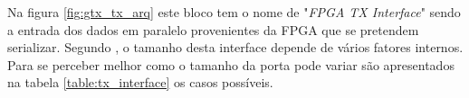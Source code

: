 Na figura \ref{fig:gtx_tx_arq} este bloco tem o nome de "\textit{FPGA TX Interface}" sendo a entrada dos dados em paralelo provenientes da FPGA que se pretendem serializar. Segundo \cite{R011}, o tamanho desta interface depende de vários fatores internos. Para se perceber melhor como o tamanho da porta pode variar são apresentados na tabela \ref{table:tx_interface} os casos possíveis.


\begin{table}[h!]
	\centering
		\caption[Tamanhos da interface da FPGA com o GTX transmissor]{Tamanhos da interface da FPGA com o GTX transmissor (adaptada de \cite{R011})}
	\label{table:tx_interface}
\end{table}
